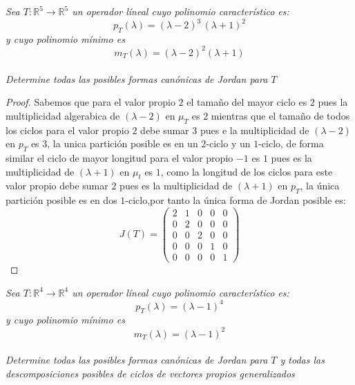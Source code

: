 \documentclass[11pt]{article}
\newcommand{\R}{\mathbb{R}}
\begin{document}
\begin{tcolorbox}[title = \textcolor{black}{\textcolor{white}{Problema 3}}]
\textit{Sea $T:\R^5\rightarrow \R^5$ un operador l\'ineal cuyo polinomio caracter\'istico es:
\begin{equation*}
    p_T(\lambda)=(\lambda-2)^3\,(\lambda+1)^2
\end{equation*}
y cuyo polinomio m\'inimo es
\begin{equation*}
    m_T(\lambda)=(\lambda-2)^2(\lambda+1)
\end{equation*}\,\\
Determine todas las posibles formas can\'onicas de Jordan para $T$}
\end{tcolorbox}
\begin{proof}
    Sabemos que para el valor propio $2$ el tamaño del mayor ciclo es $2$ pues la multiplicidad algerabica de $(\lambda-2)$ en $\mu_T$ es $2$ mientras que el tamaño de todos los ciclos para el valor propio $2$ debe sumar $3$ pues e la multiplicidad de $(\lambda-2)$ en $p_T$ es $3$, la unica partici\'on posible
    es en un $2$-ciclo y  un $1$-ciclo, de forma similar el ciclo de mayor longitud para el valor propio $-1$ es $1$ pues es la multiplicidad de $(\lambda+1)$ en $\mu_t$ es $1$, como la longitud de los ciclos para este valor propio debe sumar $2$ pues es la multiplicidad de $(\lambda+1)$ en $p_T$, la \'unica partici\'on posible es en dos $1$-ciclo,por tanto la \'unica forma de Jordan posible es:\,\\
    \begin{equation*}
        J(T)=\begin{pmatrix}
            2&1&0&0&0\\
            0&2&0&0&0\\
            0&0&2&0&0\\
            0&0&0&1&0\\
            0&0&0&0&1
        \end{pmatrix}
    \end{equation*}
\end{proof}
\begin{tcolorbox}[title = \textcolor{black}{\textcolor{white}{Problema 4}}]
\textit{Sea $T:\R^4\rightarrow \R^4$ un operador l\'ineal cuyo polinomio caracter\'istico es:
\begin{equation*}
    p_T(\lambda)=(\lambda-1)^4
\end{equation*}
y cuyo polinomio m\'inimo es
\begin{equation*}
    m_T(\lambda)=(\lambda-1)^2
\end{equation*}\,\\
Determine todas las posibles formas can\'onicas de Jordan para $T$ y todas las descomposiciones posibles de ciclos de vectores propios generalizados}
\end{tcolorbox}
\end{document}
